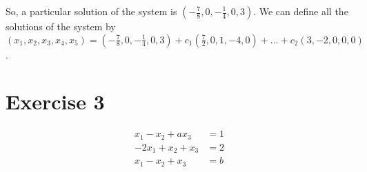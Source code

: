 \documentclass[a4paper]{article}
\begin{document}
So, a particular solution of the system is $(- \frac{7}{8}, 0, - \frac{1}{4}, 0, 3)$. We can define all the solutions of the system by \\ $(x_1, x_2, x_3, x_4, x_5) = (- \frac{7}{8}, 0, - \frac{1}{4}, 0, 3) + c_1 (\frac{7}{2}, 0, 1, -4, 0) + \dots + c_2 (3, -2, 0, 0, 0)$.

\section*{Exercise 3}
\begin{align*}
x_1 - x_2 + ax_3 &= 1 \\
-2x_1 + x_2 + x_3 &= 2 \\
x_1 - x_2 + x_3 &= b
\end{align*}
\end{document}
